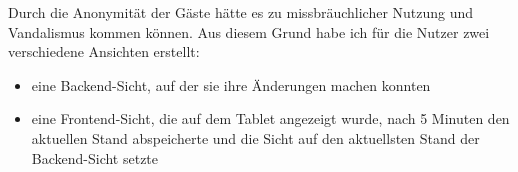 Durch die Anonymität der Gäste hätte es zu missbräuchlicher Nutzung und Vandalismus kommen können.
Aus diesem Grund habe ich für die Nutzer zwei verschiedene Ansichten erstellt:
\begin{itemize}
  \item eine Backend-Sicht, auf der sie ihre Änderungen machen konnten
  \item eine Frontend-Sicht, die auf dem Tablet angezeigt wurde, nach 5 Minuten den aktuellen Stand abspeicherte und die Sicht auf den aktuellsten Stand der Backend-Sicht setzte
\end{itemize}



